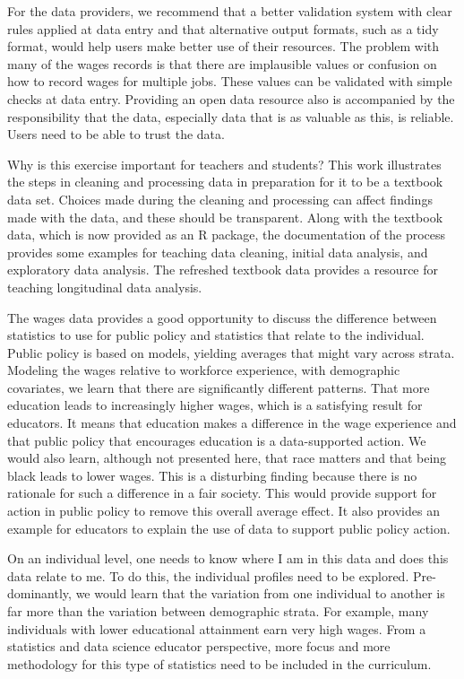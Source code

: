 \documentclass[12pt]{article}
\begin{document}
For the data providers, we recommend that a better validation system with clear rules applied at data entry and that alternative output formats, such as a tidy format, would help users make better use of their resources. The problem with many of the wages records is that there are implausible values or confusion on how to record wages for multiple jobs. These values can be validated with simple checks at data entry. Providing an open data resource also is accompanied by the responsibility that the data, especially data that is as valuable as this, is reliable. Users need to be able to trust the data.

Why is this exercise important for teachers and students? This work illustrates the steps in cleaning and processing data in preparation for it to be a textbook data set. Choices made during the cleaning and processing can affect findings made with the data, and these should be transparent. Along with the textbook data, which is now provided as an R package, the documentation of the process provides some examples for teaching data cleaning, initial data analysis, and exploratory data analysis. The refreshed textbook data provides a resource for teaching longitudinal data analysis.

The wages data provides a good opportunity to discuss the difference between statistics to use for public policy and statistics that relate to the individual. Public policy is based on models, yielding averages that might vary across strata. Modeling the wages relative to workforce experience, with demographic covariates, we learn that there are significantly different patterns. That more education leads to increasingly higher wages, which is a satisfying result for educators. It means that education makes a difference in the wage experience and that public policy that encourages education is a data-supported action. We would also learn, although not presented here, that race matters and that being black leads to lower wages. This is a disturbing finding because there is no rationale for such a difference in a fair society. This would provide support for action in public policy to remove this overall average effect. It also provides an example for educators to explain the use of data to support public policy action.

On an individual level, one needs to know where I am in this data and does this data relate to me. To do this, the individual profiles need to be explored. Pre-dominantly, we would learn that the variation from one individual to another is far more than the variation between demographic strata. For example, many individuals with lower educational attainment earn very high wages. From a statistics and data science educator perspective, more focus and more methodology for this type of statistics need to be included in the curriculum.
\end{document}
